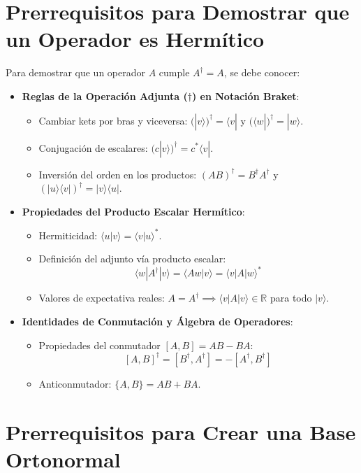 \documentclass{article}
\begin{document}
\section{Prerrequisitos para Demostrar que un Operador es Hermítico}

Para demostrar que un operador $A$ cumple $A^\dagger = A$, se debe conocer:

\begin{itemize}
    \item \textbf{Reglas de la Operación Adjunta ($\dagger$) en Notación Braket}:
    \begin{itemize}
        \item Cambiar kets por bras y viceversa: $(|v\rangle)^\dagger = \langle v|$ y $(\langle w|)^\dagger = |w\rangle$.
        \item Conjugación de escalares: $(c|v\rangle)^\dagger = c^*\langle v|$.
        \item Inversión del orden en los productos: $(AB)^\dagger = B^\dagger A^\dagger$ y $(|u\rangle\langle v|)^\dagger = |v\rangle\langle u|$.
    \end{itemize}
    \item \textbf{Propiedades del Producto Escalar Hermítico}:
    \begin{itemize}
        \item Hermiticidad: $\langle u|v\rangle = \langle v|u\rangle^*$.
        \item Definición del adjunto vía producto escalar:
        \[
        \langle w|A^\dagger|v\rangle = \langle Aw|v\rangle = \langle v|A|w\rangle^*
        \]
        \item Valores de expectativa reales: $A = A^\dagger \implies \langle v|A|v\rangle \in \mathbb{R}$ para todo $|v\rangle$.
    \end{itemize}
    \item \textbf{Identidades de Conmutación y Álgebra de Operadores}:
    \begin{itemize}
        \item Propiedades del conmutador $[A, B] = AB - BA$:
        \[
        [A, B]^\dagger = [B^\dagger, A^\dagger] = -[A^\dagger, B^\dagger]
        \]
        \item Anticonmutador: $\{A, B\} = AB + BA$.
    \end{itemize}
\end{itemize}

\section{Prerrequisitos para Crear una Base Ortonormal}
\end{document}
